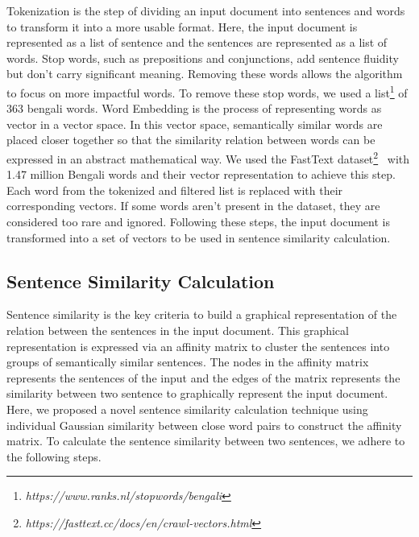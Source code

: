 Tokenization is the step of dividing an input document into sentences and words to transform it into a more usable format. Here, the input document is represented as a list of sentence and the sentences are represented as a list of words. Stop words, such as prepositions and conjunctions, add sentence fluidity but don’t carry significant meaning. Removing these words allows the algorithm to focus on more impactful words. To remove these stop words, we used a list\footnote{\textit{https://www.ranks.nl/stopwords/bengali}} of 363 bengali words. Word Embedding is the process of representing  words as vector in a vector space. In this vector space, semantically similar words are placed closer together so that the similarity relation between words can be expressed in an abstract mathematical way. We used the FastText dataset\footnote{\textit{https://fasttext.cc/docs/en/crawl-vectors.html}}~\cite{grave-etal-2018-fasttext} with 1.47 million Bengali words and their vector representation to achieve this step. Each word from the tokenized and filtered list is replaced with their corresponding vectors. If some words aren't present in the dataset, they are considered too rare and ignored. Following these steps, the input document is transformed into a set of vectors to be used in sentence similarity calculation. 

\subsection{Sentence Similarity Calculation}\label{subsec:sentence-similarity-calculation}
Sentence similarity is the key criteria to build a graphical representation of the relation between the sentences in the input document. This graphical representation is expressed via an affinity matrix to cluster the sentences into groups of semantically similar sentences. The nodes in the affinity matrix represents the sentences of the input and the edges of the matrix represents the similarity between two sentence to graphically represent the input document. Here, we proposed a novel sentence similarity calculation technique using individual Gaussian similarity between close word pairs to construct the affinity matrix. To calculate the sentence similarity between two sentences, we adhere to the following steps.\\

